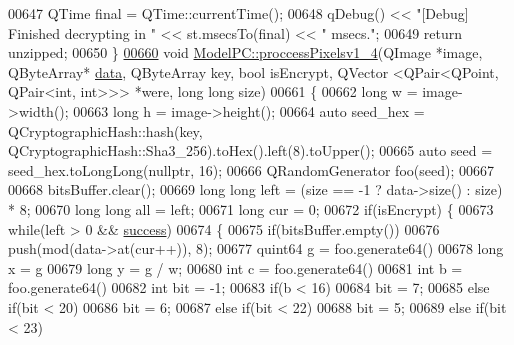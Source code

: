 \begin{DoxyCode}
00647     QTime \textcolor{keyword}{final} = QTime::currentTime();
00648     qDebug() << \textcolor{stringliteral}{"[Debug] Finished decrypting in "} << st.msecsTo(\textcolor{keyword}{final}) << \textcolor{stringliteral}{" msecs."};
00649     \textcolor{keywordflow}{return} unzipped;
00650 \}
\hypertarget{modelpc_8cpp_source_l00660}{}\hyperlink{class_model_p_c_a5cdb4d1d61ff62ee9d45b496a7dbf1fb}{00660} \textcolor{keywordtype}{void} \hyperlink{class_model_p_c_a5cdb4d1d61ff62ee9d45b496a7dbf1fb}{ModelPC::proccessPixelsv1\_4}(QImage *image, QByteArray* 
      \hyperlink{namespace_errors_dict_setup_adf4c30d205d29df7343e26f7c62b0685}{data}, QByteArray key, \textcolor{keywordtype}{bool} isEncrypt, QVector <QPair<QPoint, QPair<int, int>>> *were, \textcolor{keywordtype}{long} \textcolor{keywordtype}{long} size)
00661 \{
00662     \textcolor{keywordtype}{long} w = image->width();
00663     \textcolor{keywordtype}{long} h = image->height();
00664     \textcolor{keyword}{auto} seed\_hex = QCryptographicHash::hash(key, QCryptographicHash::Sha3\_256).toHex().left(8).toUpper();
00665     \textcolor{keyword}{auto} seed = seed\_hex.toLongLong(\textcolor{keyword}{nullptr}, 16);
00666     QRandomGenerator foo(seed);
00667 
00668     bitsBuffer.clear();
00669     \textcolor{keywordtype}{long} \textcolor{keywordtype}{long} left = (size == -1 ? data->size() : size) * 8;
00670     \textcolor{keywordtype}{long} \textcolor{keywordtype}{long} all = left;
00671     \textcolor{keywordtype}{long} cur = 0;
00672     \textcolor{keywordflow}{if}(isEncrypt) \{
00673         \textcolor{keywordflow}{while}(left > 0 && \hyperlink{class_model_p_c_a945ffbbc44a832b953c191debd448f4c}{success})
00674         \{
00675             \textcolor{keywordflow}{if}(bitsBuffer.empty())
00676                 push(mod(data->at(cur++)), 8);
00677             quint64 g = foo.generate64() %
00678             \textcolor{keywordtype}{long} x = g %
00679             \textcolor{keywordtype}{long} y = g / w;
00680             \textcolor{keywordtype}{int} c = foo.generate64() %
00681             \textcolor{keywordtype}{int} b = foo.generate64() %
00682             \textcolor{keywordtype}{int} bit = -1;
00683             \textcolor{keywordflow}{if}(b < 16)
00684                 bit = 7;
00685             \textcolor{keywordflow}{else} \textcolor{keywordflow}{if}(bit < 20)
00686                 bit = 6;
00687             \textcolor{keywordflow}{else} \textcolor{keywordflow}{if}(bit < 22)
00688                 bit = 5;
00689             \textcolor{keywordflow}{else} \textcolor{keywordflow}{if}(bit < 23)

\end{DoxyCode}
